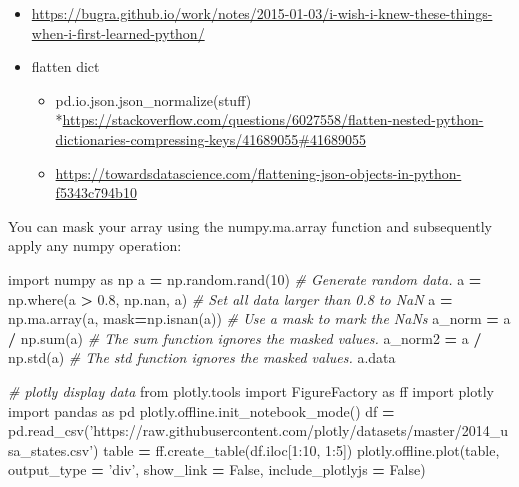 \documentclass[]{book}
\newenvironment{Shaded}{\begin{snugshade}}{\end{snugshade}}
\newcommand{\DecValTok}[1]{\textcolor[rgb]{0.00,0.00,0.81}{#1}}
\newcommand{\FloatTok}[1]{\textcolor[rgb]{0.00,0.00,0.81}{#1}}
\newcommand{\StringTok}[1]{\textcolor[rgb]{0.31,0.60,0.02}{#1}}
\newcommand{\ImportTok}[1]{#1}
\newcommand{\CommentTok}[1]{\textcolor[rgb]{0.56,0.35,0.01}{\textit{#1}}}
\newcommand{\VariableTok}[1]{\textcolor[rgb]{0.00,0.00,0.00}{#1}}
\newcommand{\OperatorTok}[1]{\textcolor[rgb]{0.81,0.36,0.00}{\textbf{#1}}}
\newcommand{\BuiltInTok}[1]{#1}
\newcommand{\NormalTok}[1]{#1}
\providecommand{\tightlist}{%
  \setlength{\itemsep}{0pt}\setlength{\parskip}{0pt}}
\theoremstyle{definition}
\theoremstyle{definition}
\theoremstyle{definition}
\theoremstyle{remark}
\begin{document}
\begin{itemize}
\item
  \url{https://bugra.github.io/work/notes/2015-01-03/i-wish-i-knew-these-things-when-i-first-learned-python/}
\item
  flatten dict

  \begin{itemize}
  \tightlist
  \item
    pd.io.json.json\_normalize(stuff)
    *\url{https://stackoverflow.com/questions/6027558/flatten-nested-python-dictionaries-compressing-keys/41689055\#41689055}
  \item
    \url{https://towardsdatascience.com/flattening-json-objects-in-python-f5343c794b10}
  \end{itemize}
\end{itemize}

You can mask your array using the numpy.ma.array function and
subsequently apply any numpy operation:

\begin{Shaded}
\begin{Highlighting}[]
\ImportTok{import}\NormalTok{ numpy }\ImportTok{as}\NormalTok{ np}
\NormalTok{a }\OperatorTok{=}\NormalTok{ np.random.rand(}\DecValTok{10}\NormalTok{)            }\CommentTok{# Generate random data.}
\NormalTok{a }\OperatorTok{=}\NormalTok{ np.where(a }\OperatorTok{>} \FloatTok{0.8}\NormalTok{, np.nan, a)  }\CommentTok{# Set all data larger than 0.8 to NaN}
\NormalTok{a }\OperatorTok{=}\NormalTok{ np.ma.array(a, mask}\OperatorTok{=}\NormalTok{np.isnan(a)) }\CommentTok{# Use a mask to mark the NaNs}
\NormalTok{a_norm  }\OperatorTok{=}\NormalTok{ a }\OperatorTok{/}\NormalTok{ np.}\BuiltInTok{sum}\NormalTok{(a) }\CommentTok{# The sum function ignores the masked values.}
\NormalTok{a_norm2 }\OperatorTok{=}\NormalTok{ a }\OperatorTok{/}\NormalTok{ np.std(a) }\CommentTok{# The std function ignores the masked values.}
\NormalTok{a.data}
\end{Highlighting}
\end{Shaded}

\begin{Shaded}
\begin{Highlighting}[]
\CommentTok{# plotly display data}
\ImportTok{from}\NormalTok{ plotly.tools }\ImportTok{import}\NormalTok{ FigureFactory }\ImportTok{as}\NormalTok{ ff}
\ImportTok{import}\NormalTok{ plotly}
\ImportTok{import}\NormalTok{ pandas }\ImportTok{as}\NormalTok{ pd}
\NormalTok{plotly.offline.init_notebook_mode()}
\NormalTok{df }\OperatorTok{=}\NormalTok{ pd.read_csv(}\StringTok{'https://raw.githubusercontent.com/plotly/datasets/master/2014_usa_states.csv'}\NormalTok{)}
\NormalTok{table }\OperatorTok{=}\NormalTok{ ff.create_table(df.iloc[}\DecValTok{1}\NormalTok{:}\DecValTok{10}\NormalTok{, }\DecValTok{1}\NormalTok{:}\DecValTok{5}\NormalTok{])}
\NormalTok{plotly.offline.plot(table, output_type }\OperatorTok{=} \StringTok{'div'}\NormalTok{, show_link }\OperatorTok{=} \VariableTok{False}\NormalTok{, include_plotlyjs }\OperatorTok{=} \VariableTok{False}\NormalTok{)}
\end{Highlighting}
\end{Shaded}
\end{document}
